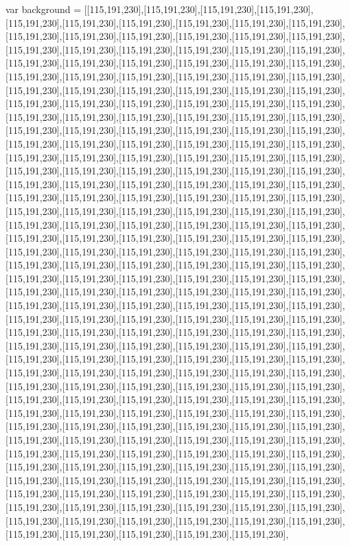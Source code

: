 var background = [[115,191,230],[115,191,230],[115,191,230],[115,191,230],[115,191,230],[115,191,230],[115,191,230],[115,191,230],[115,191,230],[115,191,230],[115,191,230],[115,191,230],[115,191,230],[115,191,230],[115,191,230],[115,191,230],[115,191,230],[115,191,230],[115,191,230],[115,191,230],[115,191,230],[115,191,230],[115,191,230],[115,191,230],[115,191,230],[115,191,230],[115,191,230],[115,191,230],[115,191,230],[115,191,230],[115,191,230],[115,191,230],[115,191,230],[115,191,230],[115,191,230],[115,191,230],[115,191,230],[115,191,230],[115,191,230],[115,191,230],[115,191,230],[115,191,230],[115,191,230],[115,191,230],[115,191,230],[115,191,230],[115,191,230],[115,191,230],[115,191,230],[115,191,230],[115,191,230],[115,191,230],[115,191,230],[115,191,230],[115,191,230],[115,191,230],[115,191,230],[115,191,230],[115,191,230],[115,191,230],[115,191,230],[115,191,230],[115,191,230],[115,191,230],[115,191,230],[115,191,230],[115,191,230],[115,191,230],[115,191,230],[115,191,230],[115,191,230],[115,191,230],[115,191,230],[115,191,230],[115,191,230],[115,191,230],[115,191,230],[115,191,230],[115,191,230],[115,191,230],[115,191,230],[115,191,230],[115,191,230],[115,191,230],[115,191,230],[115,191,230],[115,191,230],[115,191,230],[115,191,230],[115,191,230],[115,191,230],[115,191,230],[115,191,230],[115,191,230],[115,191,230],[115,191,230],[115,191,230],[115,191,230],[115,191,230],[115,191,230],[115,191,230],[115,191,230],[115,191,230],[115,191,230],[115,191,230],[115,191,230],[115,191,230],[115,191,230],[115,191,230],[115,191,230],[115,191,230],[115,191,230],[115,191,230],[115,191,230],[115,191,230],[115,191,230],[115,191,230],[115,191,230],[115,191,230],[115,191,230],[115,191,230],[115,191,230],[115,191,230],[115,191,230],[115,191,230],[115,191,230],[115,191,230],[115,191,230],[115,191,230],[115,191,230],[115,191,230],[115,191,230],[115,191,230],[115,191,230],[115,191,230],[115,191,230],[115,191,230],[115,191,230],[115,191,230],[115,191,230],[115,191,230],[115,191,230],[115,191,230],[115,191,230],[115,191,230],[115,191,230],[115,191,230],[115,191,230],[115,191,230],[115,191,230],[115,191,230],[115,191,230],[115,191,230],[115,191,230],[115,191,230],[115,191,230],[115,191,230],[115,191,230],[115,191,230],[115,191,230],[115,191,230],[115,191,230],[115,191,230],[115,191,230],[115,191,230],[115,191,230],[115,191,230],[115,191,230],[115,191,230],[115,191,230],[115,191,230],[115,191,230],[115,191,230],[115,191,230],[115,191,230],[115,191,230],[115,191,230],[115,191,230],[115,191,230],[115,191,230],[115,191,230],[115,191,230],[115,191,230],[115,191,230],[115,191,230],[115,191,230],[115,191,230],[115,191,230],[115,191,230],[115,191,230],[115,191,230],[115,191,230],[115,191,230],[115,191,230],[115,191,230],[115,191,230],[115,191,230],[115,191,230],[115,191,230],[115,191,230],[115,191,230],[115,191,230],[115,191,230],[115,191,230],[115,191,230],[115,191,230],[115,191,230],[115,191,230],[115,191,230],[115,191,230],[115,191,230],[115,191,230],[115,191,230],[115,191,230],[115,191,230],[115,191,230],[115,191,230],[115,191,230],[115,191,230],[115,191,230],[115,191,230],[115,191,230],[115,191,230],[115,191,230],[115,191,230],[115,191,230],[115,191,230],[115,191,230],[115,191,230],[115,191,230],[115,191,230],[115,191,230],[115,191,230],[115,191,230],[115,191,230],[115,191,230],[115,191,230],